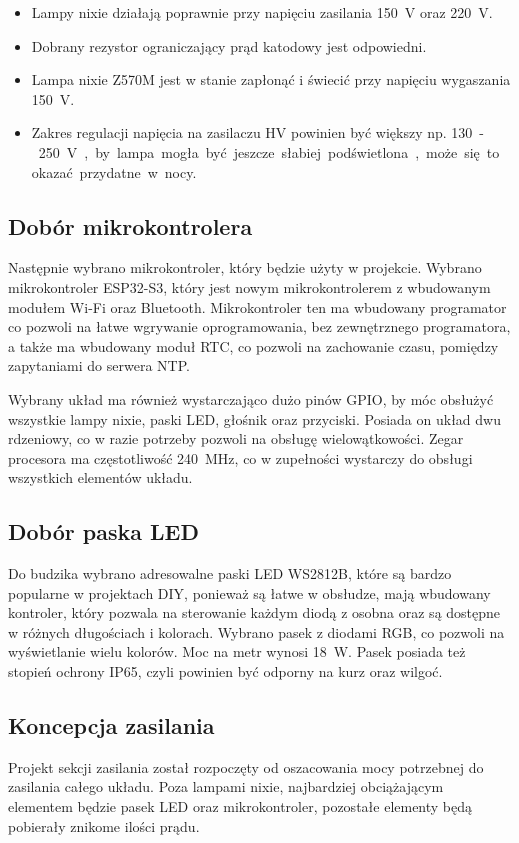 \documentclass[../main.tex]{subfiles}
\begin{document}
\begin{itemize}
    \item Lampy nixie działają poprawnie przy napięciu zasilania \SI{150}{\volt} oraz \SI{220}{\volt}.
    \item Dobrany rezystor ograniczający prąd katodowy jest odpowiedni.
    \item Lampa nixie Z570M jest w stanie zapłonąć i świecić przy napięciu wygaszania \SI{150}{\volt}.
    \item Zakres regulacji napięcia na zasilaczu HV powinien być większy np. \SI{130}-\SI{250}{\volt}, by lampa mogła być jeszcze słabiej podświetlona, może się to okazać przydatne w nocy.
\end{itemize}

\subsection{Dobór mikrokontrolera}

Następnie wybrano mikrokontroler, który będzie użyty w projekcie. Wybrano mikrokontroler ESP32-S3, który jest nowym mikrokontrolerem z wbudowanym modułem Wi-Fi oraz Bluetooth.
Mikrokontroler ten ma wbudowany programator co pozwoli na łatwe wgrywanie oprogramowania, bez zewnętrznego programatora, a także ma wbudowany moduł RTC,
co pozwoli na zachowanie czasu, pomiędzy zapytaniami do serwera NTP.

Wybrany układ ma również wystarczająco dużo pinów GPIO, by móc obsłużyć wszystkie lampy nixie, paski LED, głośnik oraz przyciski.
Posiada on układ dwu rdzeniowy, co w razie potrzeby pozwoli na obsługę wielowątkowości. Zegar procesora ma częstotliwość \SI{240}{\mega\hertz},
co w zupełności wystarczy do obsługi wszystkich elementów układu.

\subsection{Dobór paska LED}
Do budzika wybrano adresowalne paski LED WS2812B, 
które są bardzo popularne w projektach DIY, ponieważ są łatwe w obsłudze, mają wbudowany kontroler,
który pozwala na sterowanie każdym diodą z osobna oraz są dostępne w różnych długościach i kolorach.
Wybrano pasek z diodami RGB, co pozwoli na wyświetlanie wielu kolorów. Moc na metr wynosi \SI{18}{\watt}.
Pasek posiada też stopień ochrony IP65, czyli powinien być odporny na kurz oraz wilgoć.

\subsection{Koncepcja zasilania}
Projekt sekcji zasilania został rozpoczęty od oszacowania mocy potrzebnej do zasilania całego układu.
Poza lampami nixie, najbardziej obciążającym elementem będzie pasek LED oraz mikrokontroler, pozostałe elementy będą pobierały znikome ilości prądu.
\end{document}
